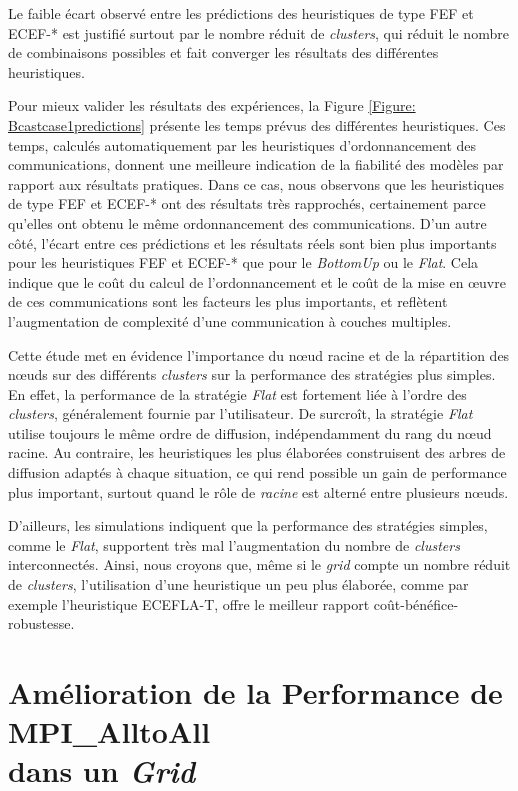 Le faible écart observé entre les prédictions des heuristiques de
type FEF et ECEF-{*} est justifié surtout par le nombre réduit de
\textit{clusters}, qui réduit le nombre de combinaisons possibles et fait converger
les résultats des différentes heuristiques. 

Pour mieux valider les résultats des expériences, la Figure \ref{Figure: Bcastcase1predictions}
présente les temps prévus des différentes heuristiques. Ces temps,
calculés automatiquement par les heuristiques d'ordonnancement des
communications, donnent une meilleure indication de la fiabilité des
modèles par rapport aux résultats pratiques. Dans ce cas, nous observons
que les heuristiques de type FEF et ECEF-{*} ont des résultats très
rapprochés, certainement parce qu'elles ont obtenu le même ordonnancement
des communications. D'un autre côté, l'écart entre ces prédictions
et les résultats réels sont bien plus importants pour les heuristiques
FEF et ECEF-{*} que pour le \textit{BottomUp} ou le \textit{Flat}. Cela indique que
le coût du calcul de l'ordonnancement et le coût de la mise en {\oe}uvre
de ces communications sont les facteurs les plus importants, et reflètent
l'augmentation de complexité d'une communication à couches multiples.

Cette étude met en évidence l'importance
du n{\oe}ud racine et de la répartition des n{\oe}uds sur des différents
\textit{clusters} sur la performance des stratégies plus simples. En effet,
la performance de la stratégie \textit{Flat} est fortement liée à l'ordre des \textit{clusters}, généralement fournie par l'utilisateur.
De surcroît, la stratégie \textit{Flat} utilise toujours le même ordre de diffusion,
indépendamment du rang du n{\oe}ud racine. Au contraire, les heuristiques
les plus élaborées construisent des arbres de diffusion adaptés à
chaque situation, ce qui rend possible un gain de performance plus
important, surtout quand le rôle de \emph{racine} est alterné entre
plusieurs n{\oe}uds.

D'ailleurs, les simulations indiquent que la performance des stratégies
simples, comme le \textit{Flat}, supportent très mal l'augmentation du nombre
de \textit{clusters} interconnectés.  Ainsi, nous croyons que, même si
le \textit{grid} compte un nombre réduit de \textit{clusters}, l'utilisation d'une
heuristique un peu plus élaborée, comme par exemple l'heuristique
ECEFLA-T, offre le meilleur rapport coût-bénéfice-robustesse.


\section{Amélioration de la Performance de MPI\_AlltoAll \\dans un \textit{Grid}}

